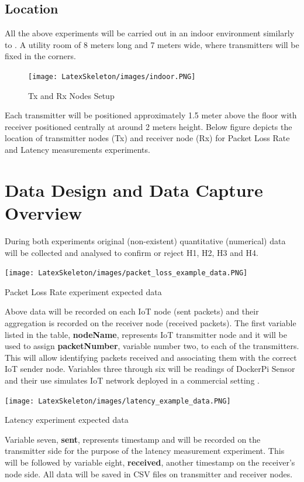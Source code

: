 \documentclass[oneside,12pt]{book}
\begin{document}
\subsection{Location}
All the above experiments will be carried out in an indoor environment similarly to \cite{Kurji2021}. A utility room of 8 meters long and 7 meters wide, where transmitters will be fixed in the corners. 
\begin{figure}[H]
\centering
\texttt{[image: LatexSkeleton/images/indoor.PNG]}
\caption{Tx and Rx Nodes Setup}
\end{figure}
\noindent Each transmitter will be positioned approximately 1.5 meter above the floor with receiver positioned centrally at around 2 meters height. Below figure  depicts the location of transmitter nodes (Tx) and receiver node (Rx) for Packet Loss Rate and Latency measurements experiments.
\section{Data Design and Data Capture Overview}
During both experiments original (non-existent) quantitative (numerical) data will be collected and analysed to confirm or reject H1, H2, H3 and H4.
\begin{table}[H]
  \centering
  \label{tbl:Packet Loss Rate expected data}
  \texttt{[image: LatexSkeleton/images/packet\_loss\_example\_data.PNG]}
  \caption{Packet Loss Rate experiment expected data}
\end{table}
\noindent Above data will be recorded on each IoT node (sent packets) and their aggregation is recorded on the receiver node (received packets). The first variable listed in the table, \textbf{nodeName}, represents IoT transmitter node and it will be used to assign \textbf{packetNumber}, variable number two, to each of the transmitters. This will allow identifying packets received and associating them with the correct IoT sender node. Variables three through six will be readings of DockerPi Sensor and their use simulates IoT network deployed in a commercial setting \citep{Kuipers}.
\begin{table}[H]
  \centering
  \label{tbl:Latency experiment expected data}
  \texttt{[image: LatexSkeleton/images/latency\_example\_data.PNG]}
  \caption{Latency experiment expected data }
\end{table}
 \noindent Variable seven, \textbf{sent}, represents timestamp and will be recorded on the transmitter side for the purpose of the latency measurement experiment. This will be followed by variable eight, \textbf{received}, another timestamp on the receiver’s node side. All data will be saved in CSV files on transmitter and receiver nodes.
\end{document}
